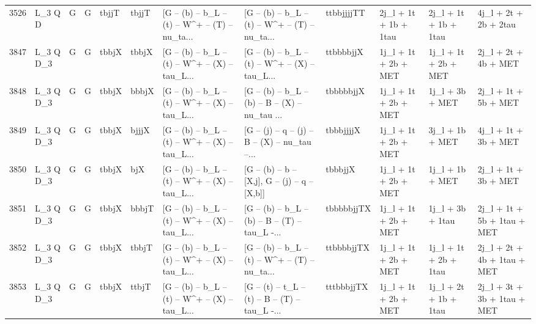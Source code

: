 \begin{tabular}{llllllllllll}
3526 &      L\_3 Q D &     G &     G &       tbjjT &       tbjjT &  [G -- (b) -- b\_L -- (t) -- W\textasciicircum + -- (T) -- nu\_ta... &  [G -- (b) -- b\_L -- (t) -- W\textasciicircum + -- (T) -- nu\_ta... &  ttbbjjjjTT &    2j\_l + 1t + 1b + 1tau &    2j\_l + 1t + 1b + 1tau &              4j\_l + 2t + 2b + 2tau \\
3847 &    L\_3 Q D\_3 &     G &     G &       tbbjX &       tbbjX &  [G -- (b) -- b\_L -- (t) -- W\textasciicircum + -- (X) -- tau\_L... &  [G -- (b) -- b\_L -- (t) -- W\textasciicircum + -- (X) -- tau\_L... &   ttbbbbjjX &     1j\_l + 1t + 2b + MET &     1j\_l + 1t + 2b + MET &               2j\_l + 2t + 4b + MET \\
3848 &    L\_3 Q D\_3 &     G &     G &       tbbjX &       bbbjX &  [G -- (b) -- b\_L -- (t) -- W\textasciicircum + -- (X) -- tau\_L... &  [G -- (b) -- b\_L -- (b) -- B -- (X) -- nu\_tau ... &   tbbbbbjjX &     1j\_l + 1t + 2b + MET &          1j\_l + 3b + MET &               2j\_l + 1t + 5b + MET \\
3849 &    L\_3 Q D\_3 &     G &     G &       tbbjX &       bjjjX &  [G -- (b) -- b\_L -- (t) -- W\textasciicircum + -- (X) -- tau\_L... &  [G -- (j) -- q -- (j) -- B -- (X) -- nu\_tau --... &   tbbbjjjjX &     1j\_l + 1t + 2b + MET &          3j\_l + 1b + MET &               4j\_l + 1t + 3b + MET \\
3850 &    L\_3 Q D\_3 &     G &     G &       tbbjX &         bjX &  [G -- (b) -- b\_L -- (t) -- W\textasciicircum + -- (X) -- tau\_L... &   [G -- (b) -- b -- [X,j], G -- (j) -- q -- [X,b]] &     tbbbjjX &     1j\_l + 1t + 2b + MET &          1j\_l + 1b + MET &               2j\_l + 1t + 3b + MET \\
3851 &    L\_3 Q D\_3 &     G &     G &       tbbjX &       bbbjT &  [G -- (b) -- b\_L -- (t) -- W\textasciicircum + -- (X) -- tau\_L... &  [G -- (b) -- b\_L -- (b) -- B -- (T) -- tau\_L -... &  tbbbbbjjTX &     1j\_l + 1t + 2b + MET &         1j\_l + 3b + 1tau &        2j\_l + 1t + 5b + 1tau + MET \\
3852 &    L\_3 Q D\_3 &     G &     G &       tbbjX &       tbbjT &  [G -- (b) -- b\_L -- (t) -- W\textasciicircum + -- (X) -- tau\_L... &  [G -- (b) -- b\_L -- (t) -- W\textasciicircum + -- (T) -- nu\_ta... &  ttbbbbjjTX &     1j\_l + 1t + 2b + MET &    1j\_l + 1t + 2b + 1tau &        2j\_l + 2t + 4b + 1tau + MET \\
3853 &    L\_3 Q D\_3 &     G &     G &       tbbjX &       ttbjT &  [G -- (b) -- b\_L -- (t) -- W\textasciicircum + -- (X) -- tau\_L... &  [G -- (t) -- t\_L -- (t) -- B -- (T) -- tau\_L -... &  tttbbbjjTX &     1j\_l + 1t + 2b + MET &    1j\_l + 2t + 1b + 1tau &        2j\_l + 3t + 3b + 1tau + MET \\

\end{tabular}
